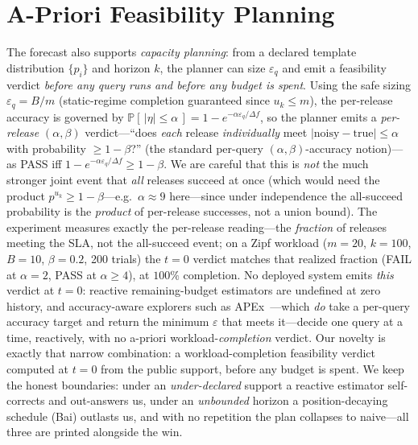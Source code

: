 \documentclass[sigconf,nonacm]{acmart}
\newcommand{\eps}{\varepsilon}
\newcommand{\Prob}{\mathbb{P}}
\begin{document}
\section{A-Priori Feasibility Planning}
\label{app:apriori}

The forecast also supports \emph{capacity planning}: from a declared template distribution $\{p_i\}$ and horizon $k$, the planner can size $\eps_q$ and emit a feasibility verdict \emph{before any query runs and before any budget is spent}. Using the safe sizing $\eps_q=B/m$ (static-regime completion guaranteed since $u_k\le m$), the per-release accuracy is governed by $\Prob[\,|\eta|\le\alpha\,]=1-e^{-\alpha\eps_q/\Delta f}$, so the planner emits a \emph{per-release} $(\alpha,\beta)$ verdict---``does \emph{each} release \emph{individually} meet $|\text{noisy}-\text{true}|\le\alpha$ with probability $\ge1-\beta$?'' (the standard per-query $(\alpha,\beta)$-accuracy notion)---as PASS iff $1-e^{-\alpha\eps_q/\Delta f}\ge1-\beta$. We are careful that this is \emph{not} the much stronger joint event that \emph{all} releases succeed at once (which would need the product $p^{u_k}\ge1-\beta$---e.g.\ $\alpha\approx9$ here---since under independence the all-succeed probability is the \emph{product} of per-release successes, not a union bound). The experiment measures exactly the per-release reading---the \emph{fraction} of releases meeting the SLA, not the all-succeed event; on a Zipf workload ($m{=}20$, $k{=}100$, $B{=}10$, $\beta{=}0.2$, 200 trials) the $t{=}0$ verdict matches that realized fraction (FAIL at $\alpha{=}2$, PASS at $\alpha\ge4$), at $100\%$ completion. No deployed system emits \emph{this} verdict at $t{=}0$: reactive remaining-budget estimators are undefined at zero history, and accuracy-aware explorers such as APEx~\cite{ge2019apex}---which \emph{do} take a per-query accuracy target and return the minimum $\eps$ that meets it---decide one query at a time, reactively, with no a-priori workload-\emph{completion} verdict. Our novelty is exactly that narrow combination: a workload-completion feasibility verdict computed at $t{=}0$ from the public support, before any budget is spent. We keep the honest boundaries: under an \emph{under-declared} support a reactive estimator self-corrects and out-answers us, under an \emph{unbounded} horizon a position-decaying schedule (Bai) outlasts us, and with no repetition the plan collapses to naive---all three are printed alongside the win.

\end{document}
